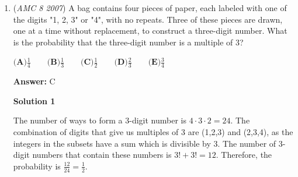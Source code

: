 \begin{enumerate}
 <a href="/wiki/index.php?title=File:AMC8\_2007\_23.png" title="File:AMC8 2007 23.png">Error creating thumbnail: Unable to save thumbnail to destination</a>
$\textbf{(A)}\ 4 \qquad\textbf{(B)}\ 6 \qquad\textbf{(C)}\ 8 \qquad\textbf{(D)}\ 10 \qquad\textbf{(E)}\ 12$

 \textbf{Answer: }B



\textbf{Solution 1}

The area of the square around the pinwheel is 25. The area of the pinwheel is equal to $\text{the square } - \text{ the white space.}$ Each of the four triangles have a base of 3 units and a height of 2.5 units, and so their combined area is 15 units squared. Then the unshaded space consists of the four triangles with total area of 15, and there are four white corner squares. Therefore the area of the pinwheel is $25-(15+4)$ which is $\boxed{\textbf{(B) 6}}$




\textbf{Solution 2}

The pinwheel is composed of $8$ congruent obtuse triangles whose base measures length $1$ and height measures length $1.5$. Using the area formula for triangles, the pinwheel has an area of
 \[8(\frac12\cdot1\cdot1.5)=8(0.75)=\boxed{\textbf{(B) 6}}.\]



	\item (\textit{AMC 8 2007}) A bag contains four pieces of paper, each labeled with one of the digits "1, 2, 3"
or "4", with no repeats. Three of these pieces are drawn, one at a time without
replacement, to construct a three-digit number. What is the probability that
the three-digit number is a multiple of 3?


 $\textbf{(A)} \frac{1}{4} \qquad \textbf{(B)} \frac{1}{3} \qquad \textbf{(C)} \frac{1}{2} \qquad \textbf{(D)} \frac{2}{3} \qquad \textbf{(E)} \frac{3}{4}$

 \textbf{Answer: }C



\textbf{Solution 1}

The number of ways to form a 3-digit number is $4 \cdot 3 \cdot 2 = 24$. The combination of digits that give us multiples of 3 are (1,2,3) and (2,3,4), as the integers in the subsets have a sum which is divisible by 3. The number of 3-digit numbers that contain these numbers is $3! + 3! = 12$. Therefore, the probability is $\frac{12}{24} = \boxed{\frac{1}{2}}$.

 




\end{enumerate}
